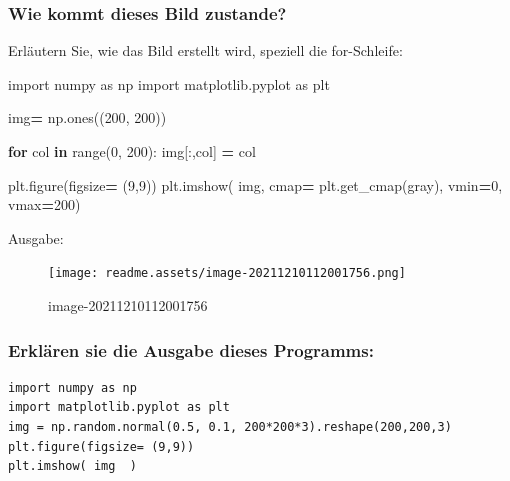 \documentclass[
  oneside]{book}
\newenvironment{Shaded}{\begin{snugshade}}{\end{snugshade}}
\newcommand{\BuiltInTok}[1]{#1}
\newcommand{\ControlFlowTok}[1]{\textcolor[rgb]{0.13,0.29,0.53}{\textbf{#1}}}
\newcommand{\DecValTok}[1]{\textcolor[rgb]{0.00,0.00,0.81}{#1}}
\newcommand{\ImportTok}[1]{#1}
\newcommand{\KeywordTok}[1]{\textcolor[rgb]{0.13,0.29,0.53}{\textbf{#1}}}
\newcommand{\NormalTok}[1]{#1}
\newcommand{\OperatorTok}[1]{\textcolor[rgb]{0.81,0.36,0.00}{\textbf{#1}}}
\newcommand{\StringTok}[1]{\textcolor[rgb]{0.31,0.60,0.02}{#1}}
\begin{document}
\hypertarget{wie-kommt-dieses-bild-zustande}{%
\subsubsection{Wie kommt dieses Bild zustande?}\label{wie-kommt-dieses-bild-zustande}}

Erläutern Sie, wie das Bild erstellt wird, speziell die for-Schleife:

\begin{Shaded}
\begin{Highlighting}[]
\ImportTok{import}\NormalTok{ numpy }\ImportTok{as}\NormalTok{ np}
\ImportTok{import}\NormalTok{ matplotlib.pyplot }\ImportTok{as}\NormalTok{ plt}

\NormalTok{img}\OperatorTok{=}\NormalTok{ np.ones((}\DecValTok{200}\NormalTok{, }\DecValTok{200}\NormalTok{))}

\ControlFlowTok{for}\NormalTok{ col }\KeywordTok{in} \BuiltInTok{range}\NormalTok{(}\DecValTok{0}\NormalTok{, }\DecValTok{200}\NormalTok{):}
\NormalTok{  img[:,col] }\OperatorTok{=}\NormalTok{ col}

\NormalTok{plt.figure(figsize}\OperatorTok{=}\NormalTok{ (}\DecValTok{9}\NormalTok{,}\DecValTok{9}\NormalTok{))}
\NormalTok{plt.imshow( img, cmap}\OperatorTok{=}\NormalTok{ plt.get\_cmap(}\StringTok{\textquotesingle{}gray\textquotesingle{}}\NormalTok{), vmin}\OperatorTok{=}\DecValTok{0}\NormalTok{, vmax}\OperatorTok{=}\DecValTok{200}\NormalTok{)}
\end{Highlighting}
\end{Shaded}

Ausgabe:

\begin{figure}
\centering
\texttt{[image: readme.assets/image-20211210112001756.png]}
\caption{image-20211210112001756}
\end{figure}

\hypertarget{erkluxe4ren-sie-die-ausgabe-dieses-programms}{%
\subsubsection{Erklären sie die Ausgabe dieses Programms:}\label{erkluxe4ren-sie-die-ausgabe-dieses-programms}}

\begin{verbatim}
import numpy as np
import matplotlib.pyplot as plt
img = np.random.normal(0.5, 0.1, 200*200*3).reshape(200,200,3)
plt.figure(figsize= (9,9))
plt.imshow( img  )
\end{verbatim}
\end{document}
